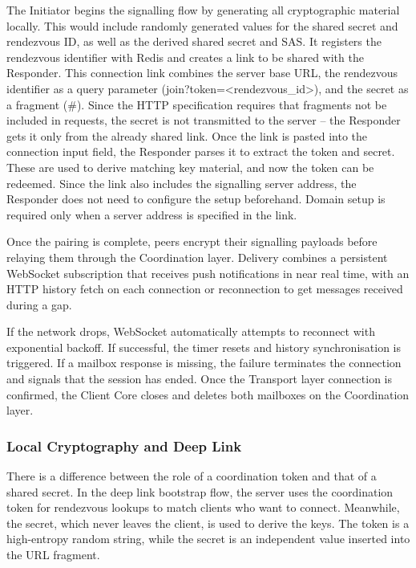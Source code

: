 \documentclass[12pt,a4paper]{article}
\begin{document}
The Initiator begins the signalling flow by generating all cryptographic material locally. This would include randomly generated values for the shared secret and rendezvous ID, as well as the derived shared secret and SAS. It registers the rendezvous identifier with Redis and creates a link to be shared with the Responder. This connection link combines the server base URL, the rendezvous identifier as a query parameter (join?token=<rendezvous\_id>), and the secret as a fragment (\#). Since the HTTP specification requires that fragments not be included in requests, the secret is not transmitted to the server – the Responder gets it only from the already shared link. Once the link is pasted into the connection input field, the Responder parses it to extract the token and secret. These are used to derive matching key material, and now the token can be redeemed. Since the link also includes the signalling server address, the Responder does not need to configure the setup beforehand. Domain setup is required only when a server address is specified in the link.

Once the pairing is complete, peers encrypt their signalling payloads before relaying them through the Coordination layer. Delivery combines a persistent WebSocket subscription that receives push notifications in near real time, with an HTTP history fetch on each connection or reconnection to get messages received during a gap.

If the network drops, WebSocket automatically attempts to reconnect with exponential backoff. If successful, the timer resets and history synchronisation is triggered. If a mailbox response is missing, the failure terminates the connection and signals that the session has ended. Once the Transport layer connection is confirmed, the Client Core closes and deletes both mailboxes on the Coordination layer.

\subsubsection{Local Cryptography and Deep Link}

There is a difference between the role of a coordination token and that of a shared secret. In the deep link bootstrap flow, the server uses the coordination token for rendezvous lookups to match clients who want to connect. Meanwhile, the secret, which never leaves the client, is used to derive the keys. The token is a high-entropy random string, while the secret is an independent value inserted into the URL fragment.
\end{document}
